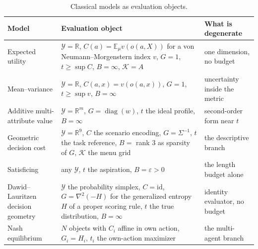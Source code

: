 \documentclass[11pt]{article}
\theoremstyle{definition}
\theoremstyle{remark}
\newcommand{\K}{\mathcal{K}}
\newcommand{\Y}{\mathcal{Y}}
\newcommand{\Ex}{\mathbb{E}}
\newcommand{\R}{\mathbb{R}}
\begin{document}
\begin{table}[h]
\centering
\small
\begin{tabular}{p{} p{} p{}}
\toprule
Model & Evaluation object & What is degenerate \\
\midrule
Expected utility & $\Y=\R$, $C(a)=\Ex_{\mu}v(o(a,X))$ for a von Neumann--Morgenstern index $v$, $G=1$, $t\ge\sup C$, $B=\infty$, $\K=A$ & one dimension, no budget \\
Mean--variance & $\Y=\R$, $C(a,x)=v(o(a,x))$, $G=1$, $t\ge\sup v$, $B=\infty$ & uncertainty inside the metric \\
Additive multi-attribute value & $\Y=\R^{m}$, $G=\operatorname{diag}(w)$, $t$ the ideal profile, $B=\infty$ & second-order form near $t$ \\
Geometric decision cost & $\Y=\R^{9}$, $C$ the scenario encoding, $G=\Sigma^{-1}$, $t$ the task reference, $B=$ rank $3$ as sparsity of $G$, $\K$ the menu grid & the descriptive branch \\
Satisficing & any $\Y$, $t$ the aspiration, $B=\varepsilon>0$ & the length budget alone \\
Dawid--Lauritzen decision geometry & $\Y$ the probability simplex, $C=\mathrm{id}$, $G=\nabla^{2}(-H)$ for the generalized entropy $H$ of a proper scoring rule, $t$ the true distribution, $B=\infty$ & identity evaluator, no budget \\
Nash equilibrium & $N$ objects with $C_{i}$ affine in own action, $G_{i}=H_{i}$, $t_{i}$ the own-action maximizer & the multi-agent branch \\
\bottomrule
\end{tabular}
\caption{Classical models as evaluation objects.}
\label{tab:classical}
\end{table}
\end{document}
